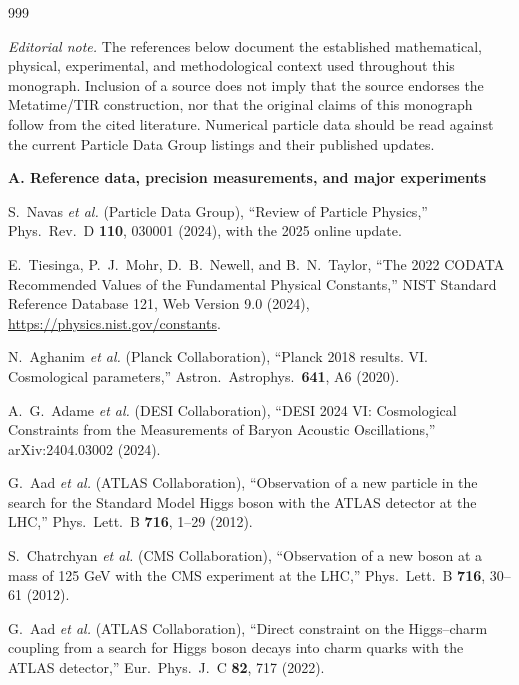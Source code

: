 
\renewcommand{\bibname}{Bibliography and Source Map}
\begin{thebibliography}{999}
\small
\sloppy

\item[]\textit{Editorial note.} The references below document the established
mathematical, physical, experimental, and methodological context used throughout
this monograph. Inclusion of a source does not imply that the source endorses the
Metatime/TIR construction, nor that the original claims of this monograph follow
from the cited literature. Numerical particle data should be read against the
current Particle Data Group listings and their published updates.

\item[]\textbf{A. Reference data, precision measurements, and major experiments}

S.~Navas \emph{et al.} (Particle Data Group),
``Review of Particle Physics,''
Phys.\ Rev.\ D \textbf{110}, 030001 (2024), with the 2025 online update.

E.~Tiesinga, P.~J.~Mohr, D.~B.~Newell, and B.~N.~Taylor,
``The 2022 CODATA Recommended Values of the Fundamental Physical Constants,''
NIST Standard Reference Database 121, Web Version 9.0 (2024),
\url{https://physics.nist.gov/constants}.

N.~Aghanim \emph{et al.} (Planck Collaboration),
``Planck 2018 results. VI. Cosmological parameters,''
Astron.\ Astrophys.\ \textbf{641}, A6 (2020).

A.~G.~Adame \emph{et al.} (DESI Collaboration),
``DESI 2024 VI: Cosmological Constraints from the Measurements of Baryon
Acoustic Oscillations,'' arXiv:2404.03002 (2024).

G.~Aad \emph{et al.} (ATLAS Collaboration),
``Observation of a new particle in the search for the Standard Model Higgs
boson with the ATLAS detector at the LHC,''
Phys.\ Lett.\ B \textbf{716}, 1--29 (2012).

S.~Chatrchyan \emph{et al.} (CMS Collaboration),
``Observation of a new boson at a mass of 125 GeV with the CMS experiment at
the LHC,'' Phys.\ Lett.\ B \textbf{716}, 30--61 (2012).

G.~Aad \emph{et al.} (ATLAS Collaboration),
``Direct constraint on the Higgs--charm coupling from a search for Higgs boson
decays into charm quarks with the ATLAS detector,''
Eur.\ Phys.\ J.\ C \textbf{82}, 717 (2022).


\end{thebibliography}

